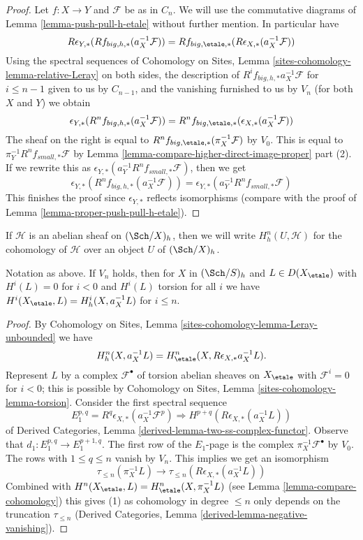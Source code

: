 \begin{proof}
Let $f : X \to Y$ and $\mathcal{F}$ be as in $C_n$.
We will use the commutative diagrams of
Lemma \ref{lemma-push-pull-h-etale}
without further mention. In particular have
$$
R\epsilon_{Y, *}(Rf_{big, h, *}(a_X^{-1}\mathcal{F})) =
Rf_{big, \etale, *}(R\epsilon_{X, *}(a_X^{-1}\mathcal{F}))
$$
Using the spectral sequences of
Cohomology on Sites, Lemma \ref{sites-cohomology-lemma-relative-Leray}
on both sides, the description of $R^if_{big, h, *}a_X^{-1}\mathcal{F}$
for $i \leq n - 1$ given to us by $C_{n - 1}$, and
the vanishing furnished to us by $V_n$
(for both $X$ and $Y$) we obtain 
$$
\epsilon_{Y, *}(R^nf_{big, h, *}(a_X^{-1}\mathcal{F})) =
R^nf_{big, \etale, *}(\epsilon_{X, *}(a_X^{-1}\mathcal{F}))
$$
The sheaf on the right is equal to
$R^nf_{big, \etale, *}(\pi_X^{-1}\mathcal{F})$ by $V_0$.
This is equal to
$\pi_Y^{-1} R^nf_{small, *}\mathcal{F}$
by Lemma \ref{lemma-compare-higher-direct-image-proper} part (2).
If we rewrite this as
$\epsilon_{Y, *}(a_Y^{-1}R^nf_{small, *}\mathcal{F})$, then we get
$$
\epsilon_{Y, *}(R^nf_{big, h, *}(a_X^{-1}\mathcal{F})) =
\epsilon_{Y, *}(a_Y^{-1}R^nf_{small, *}\mathcal{F})
$$
This finishes the proof since $\epsilon_{Y, *}$ reflects
isomorphisms (compare with the
proof of Lemma \ref{lemma-proper-push-pull-h-etale}).
\end{proof}

\noindent
If $\mathcal{H}$ is an abelian sheaf on $(\Sch/X)_h$,
then we will write $H^n_h(U, \mathcal{H})$ for the cohomology
of $\mathcal{H}$ over an object $U$ of $(\Sch/X)_h$.

\begin{lemma}
\label{lemma-V-implies-cohomology-etale-h}
Notation as above. If $V_n$ holds, then for
$X$ in $(\Sch/S)_h$ and $L \in D(X_\etale)$
with $H^i(L) = 0$ for $i < 0$ and $H^i(L)$ torsion for all $i$
we have $H^i(X_\etale, L) = H^i_h(X, a_X^{-1}L)$ for $i \leq n$.
\end{lemma}

\begin{proof}
By Cohomology on Sites, Lemma \ref{sites-cohomology-lemma-Leray-unbounded}
we have
$$
H^n_h(X, a_X^{-1}L) = H^n_\etale(X, R\epsilon_{X, *}a_X^{-1}L).
$$
Represent $L$ by a complex $\mathcal{F}^\bullet$ of torsion abelian
sheaves on $X_\etale$ with $\mathcal{F}^i = 0$ for $i < 0$; this is
possible by Cohomology on Sites, Lemma \ref{sites-cohomology-lemma-torsion}.
Consider the first spectral sequence
$$
E_1^{p, q} = R^q\epsilon_{X, *}(a_X^{-1}\mathcal{F}^p)
\Rightarrow H^{p + q}(R\epsilon_{X, *}(a_X^{-1}L))
$$
of Derived Categories, Lemma \ref{derived-lemma-two-ss-complex-functor}.
Observe that $d_1 : E_1^{p, q} \to E_1^{p + 1, q}$.
The first row of the $E_1$-page is the complex
$\pi_X^{-1}\mathcal{F}^\bullet$ by $V_0$.
The rows with $1 \leq q \leq n$ vanish by $V_n$.
This implies we get an isomorphism
$$
\tau_{\leq n}(\pi_X^{-1} L)
\longrightarrow
\tau_{\leq n}(R\epsilon_{X, *}(a_X^{-1}L))
$$
Combined with $H^n(X_\etale, L) = H^n_\etale(X, \pi_X^{-1}L)$
(see Lemma \ref{lemma-compare-cohomology}) this
gives (1) as cohomology in degree $\leq n$ only depends on the truncation
$\tau_{\leq n}$ (Derived Categories, Lemma
\ref{derived-lemma-negative-vanishing}).
\end{proof}

